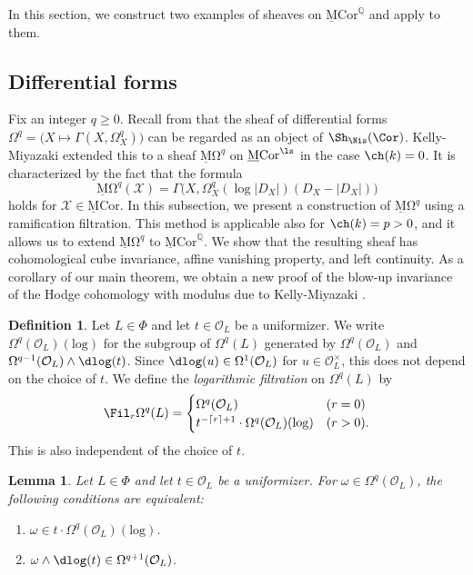 \documentclass{amsart}
\theoremstyle{plain}
\newtheorem{lemma}[theorem]{Lemma}
\theoremstyle{definition}
\newtheorem{definition}[theorem]{Definition}
\theoremstyle{remark}
\numberwithin{equation}{section}
\def\ceil#1{\lceil #1 \rceil}
\def\logrm{\mathrm{log}}
\def\MCor{\mathrm{\underline{M}Cor}}
\def\MOmega{\mathrm{\underline{M}\Omega}}
\begin{document}
In this section, we construct two examples of sheaves on $\MCor^\mathbb{Q}$ and apply  to them.

\subsection{Differential forms}

Fix an integer $q\geq 0$.
Recall from \cite[Corollary A.6.1]{KSY1} that the sheaf of differential forms $\Omega^q=\bigl(X\mapsto \Gamma(X,\Omega^q_X)\bigr)$ can be regarded as an object of $\Sh_\Nis(\Cor)$.
Kelly-Miyazaki \cite[Theorem 4.3]{KellyMiyazaki_Hodge2} extended this to a sheaf $\MOmega^q$ on $\MCor^\ls$ in the case $\ch(k)=0$.
It is characterized by the fact that the formula
$$
	\MOmega^q(\mathcal{X})=\Gamma\bigl(X,\Omega^q_X(\log|D_X|)(D_X-|D_X|)\bigr)
$$
holds for $\mathcal{X}\in \MCor$.
In this subsection, we present a construction of $\MOmega^q$ using a ramification filtration.
This method is applicable also for $\ch(k)=p>0$, and it allows us to extend $\MOmega^q$ to $\MCor^{\mathbb{Q}}$.
We show that the resulting sheaf has cohomological cube invariance, affine vanishing property, and left continuity.
As a corollary of our main theorem, we obtain a new proof of the blow-up invariance of the Hodge cohomology with modulus due to Kelly-Miyazaki \cite[Theorem 6.1]{Kelly-Miyazaki}.


\begin{definition}
    Let $L\in \Phi$ and let $t\in \mathcal{O}_L$ be a uniformizer.
    We write $\Omega^q(\mathcal{O}_L)(\logrm)$ for the subgroup of $\Omega^q(L)$ generated by $\Omega^q(\mathcal{O}_L)$ and $\Omega^{q-1}(\mathcal{O}_L)\wedge\dlog(t)$.
    Since $\dlog(u)\in \Omega^1(\mathcal{O}_L)$ for $u\in \mathcal{O}_L^\times$, this does not depend on the choice of $t$.
    We define the \emph{logarithmic filtration} on $\Omega^q(L)$ by
    $$
    \Fil_r \Omega^q(L)=\begin{cases}
        \Omega^q(\mathcal{O}_L)&(r=0)\\
        t^{-\ceil{r}+1}\cdot\Omega^q(\mathcal{O}_L)(\logrm)&(r>0).
    \end{cases}
    $$
    This is also independent of the choice of $t$.
\end{definition}

\begin{lemma}\label{omega_max}
	Let $L\in \Phi$ and let $t\in \mathcal{O}_L$ be a uniformizer.
	For $\omega\in \Omega^q(\mathcal{O}_L)$, the following conditions are equivalent:
        \begin{enumerate}
            \item $\omega\in t\cdot \Omega^q(\mathcal{O}_L)(\logrm)$.
            \item $\omega\wedge \dlog(t)\in \Omega^{q+1}(\mathcal{O}_L)$.
        \end{enumerate}
\end{lemma}
\end{document}
